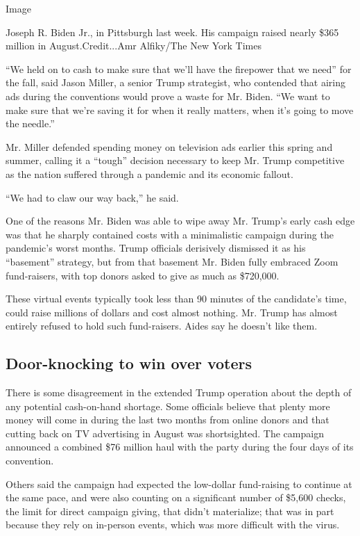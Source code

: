 Image

Joseph R. Biden Jr., in Pittsburgh last week. His campaign raised nearly
\$365 million in August.Credit...Amr Alfiky/The New York Times

``We held on to cash to make sure that we'll have the firepower that we
need'' for the fall, said Jason Miller, a senior Trump strategist, who
contended that airing ads during the conventions would prove a waste for
Mr. Biden. ``We want to make sure that we're saving it for when it
really matters, when it's going to move the needle.''

Mr. Miller defended spending money on television ads earlier this spring
and summer, calling it a ``tough'' decision necessary to keep Mr. Trump
competitive as the nation suffered through a pandemic and its economic
fallout.

``We had to claw our way back,'' he said.

One of the reasons Mr. Biden was able to wipe away Mr. Trump's early
cash edge was that he sharply contained costs with a minimalistic
campaign during the pandemic's worst months. Trump officials derisively
dismissed it as his ``basement'' strategy, but from that basement Mr.
Biden fully embraced Zoom fund-raisers, with top donors asked to give as
much as \$720,000.

These virtual events typically took less than 90 minutes of the
candidate's time, could raise millions of dollars and cost almost
nothing. Mr. Trump has almost entirely refused to hold such
fund-raisers. Aides say he doesn't like them.

\hypertarget{door-knocking-to-win-over-voters}{%
\subsection{Door-knocking to win over
voters}\label{door-knocking-to-win-over-voters}}

There is some disagreement in the extended Trump operation about the
depth of any potential cash-on-hand shortage. Some officials believe
that plenty more money will come in during the last two months from
online donors and that cutting back on TV advertising in August was
shortsighted. The campaign announced a combined \$76 million haul with
the party during the four days of its convention.

Others said the campaign had expected the low-dollar fund-raising to
continue at the same pace, and were also counting on a significant
number of \$5,600 checks, the limit for direct campaign giving, that
didn't materialize; that was in part because they rely on in-person
events, which was more difficult with the virus.

